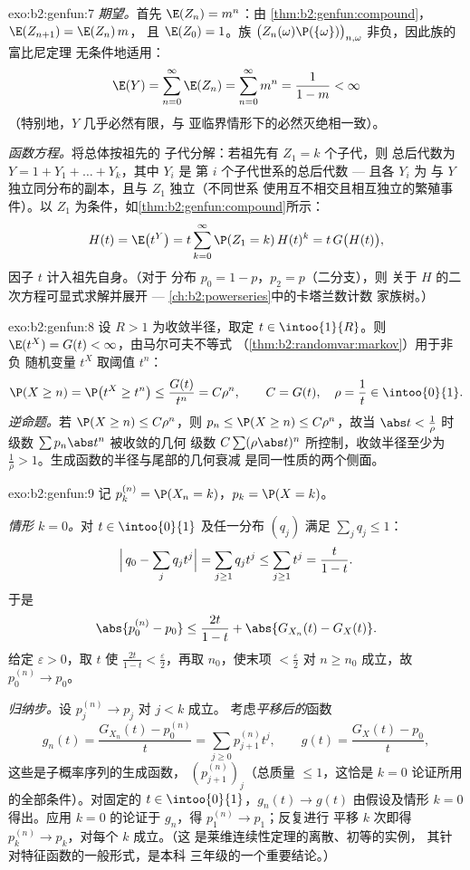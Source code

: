 \begin{solution}{exo:b2:genfun:7}
\emph{期望。}首先 $\E(Z_n) = m^n$：由
\cref{thm:b2:genfun:compound}，$\E(Z_{n+1}) = \E(Z_n)\,m$，
且 $\E(Z_0) = 1$。族 $\bigl(Z_n(\omega)\P(\{\omega\})
\bigr)_{n, \omega}$ 非负，因此族的富比尼定理
无条件地适用：
\[
\E(Y) = \sum_{n=0}^{\infty}\E(Z_n)
= \sum_{n=0}^\infty m^n = \frac{1}{1 - m} < \infty
\]
（特别地，$Y$ 几乎必然有限，与
亚临界情形下的必然灭绝相一致）。

\emph{函数方程。}将总体按祖先的
子代分解：若祖先有 $Z_1 = k$ 个子代，则
总后代数为 $Y = 1 + Y_1 + \dots + Y_k$，其中 $Y_i$ 是
第 $i$ 个子代世系的总后代数 --- 且各 $Y_i$ 为
与 $Y$ 独立同分布的副本，且与 $Z_1$ 独立（不同世系
使用互不相交且相互独立的繁殖事件）。以
$Z_1$ 为条件，如\cref{thm:b2:genfun:compound}所示：
\[
H(t) = \E\bigl(t^Y\bigr)
= t\sum_{k=0}^\infty \P(Z_1 = k)\,H(t)^k
= t\,G\bigl(H(t)\bigr),
\]
因子 $t$ 计入祖先自身。（对于
分布 $p_0 = 1 - p$，$p_2 = p$（二分支），则
关于 $H$ 的二次方程可显式求解并展开 ---
\cref{ch:b2:powerseries}中的卡塔兰数计数
家族树。）
\end{solution}

\begin{solution}{exo:b2:genfun:8}
设 $R > 1$ 为收敛半径，取定 $t \in \intoo{1}{R}$。则
$\E(t^X) = G(t) < \infty$，由马尔可夫不等式
（\cref{thm:b2:randomvar:markov}）用于非负
随机变量 $t^X$ 取阈值 $t^n$：
\[
\P(X \geq n) = \P\bigl(t^X \geq t^n\bigr)
\leq \frac{G(t)}{t^n} = C\rho^n,
\qquad C = G(t),\quad \rho = \frac1t \in \intoo{0}{1}.
\]
\emph{逆命题。}若 $\P(X \geq n) \leq C\rho^n$，则 $p_n \leq
\P(X \geq n) \leq C\rho^n$，故当 $\abs t < \frac1\rho$ 时
级数 $\sum p_n\abs t^n$ 被收敛的几何
级数 $C\sum(\rho\abs t)^n$ 所控制，收敛半径至少为
$\frac1\rho > 1$。生成函数的半径与尾部的几何衰减
是同一性质的两个侧面。
\end{solution}

\begin{solution}{exo:b2:genfun:9}
记 $p_k^{(n)} = \P(X_n = k)$，$p_k = \P(X = k)$。

\emph{情形 $k = 0$。}对 $t \in \intoo{0}{1}$ 及任一分布
$(q_j)$ 满足 $\sum_j q_j \leq 1$：
\[
\Bigl|\,q_0 - \sum_j q_jt^j\Bigr|
= \sum_{j \geq 1} q_j t^j
\leq \sum_{j\geq1}t^j = \frac{t}{1 - t} .
\]
于是
\[
\abs{p_0^{(n)} - p_0}
\leq \frac{2t}{1 - t}
+ \abs{G_{X_n}(t) - G_X(t)} .
\]
给定 $\varepsilon > 0$，取 $t$ 使 $\frac{2t}{1-t} <
\frac\varepsilon2$，再取 $n_0$，使末项 $<
\frac\varepsilon2$ 对 $n \geq n_0$ 成立，故 $p_0^{(n)} \to p_0$。

\emph{归纳步。}设 $p_j^{(n)} \to p_j$ 对 $j < k$ 成立。
考虑\emph{平移后的}函数
\[
g_n(t) = \frac{G_{X_n}(t) - p^{(n)}_0}{t}
= \sum_{j\geq0} p^{(n)}_{j+1}t^j,
\qquad
g(t) = \frac{G_X(t) - p_0}{t} ,
\]
这些是子概率序列的生成函数，
$(p^{(n)}_{j+1})_j$（总质量 $\leq 1$，这恰是
$k = 0$ 论证所用的全部条件）。对固定的 $t \in \intoo{0}{1}$，$g_n(t)
\to g(t)$ 由假设及情形 $k = 0$ 得出。应用 $k =
0$ 的论证于 $g_n$，得 $p_1^{(n)} \to p_1$；反复进行
平移 $k$ 次即得 $p_k^{(n)} \to p_k$，对每个 $k$ 成立。（这
是莱维连续性定理的离散、初等的实例，
其针对特征函数的一般形式，是本科
三年级的一个重要结论。）
\end{solution}

